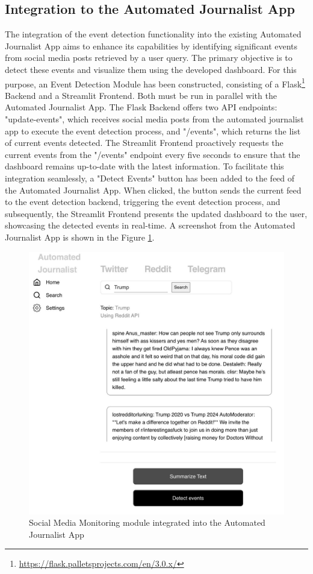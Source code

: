 \subsection{Integration to the Automated Journalist App}
\label{sec:integration}
The integration of the event detection functionality into the existing Automated Journalist App aims to enhance its capabilities by identifying significant events from social media posts retrieved by a user query. The primary objective is to detect these events and visualize them using the developed dashboard. For this purpose, an Event Detection Module has been constructed, consisting of a Flask\footnote{\url{https://flask.palletsprojects.com/en/3.0.x/}} Backend and a Streamlit Frontend. Both must be run in parallel with the Automated Journalist App. The Flask Backend offers two API endpoints: "update-events", which receives social media posts from the automated journalist app to execute the event detection process, and "/events", which returns the list of current events detected. The Streamlit Frontend proactively requests the current events from the "/events" endpoint every five seconds to ensure that the dashboard remains up-to-date with the latest information. To facilitate this integration seamlessly, a "Detect Events" button has been added to the feed of the Automated Journalist App. When clicked, the button sends the current feed to the event detection backend, triggering the event detection process, and subsequently, the Streamlit Frontend presents the updated dashboard to the user, showcasing the detected events in real-time. A screenshot from the Automated Journalist App is shown in the Figure \ref{fig:integration}.

\begin{figure}[htbp]
    \centering
    \includegraphics[width=0.95\linewidth]{Images/integration.jpeg}
    \caption{Social Media Monitoring module integrated into the Automated Journalist App}
    \label{fig:integration}
\end{figure}